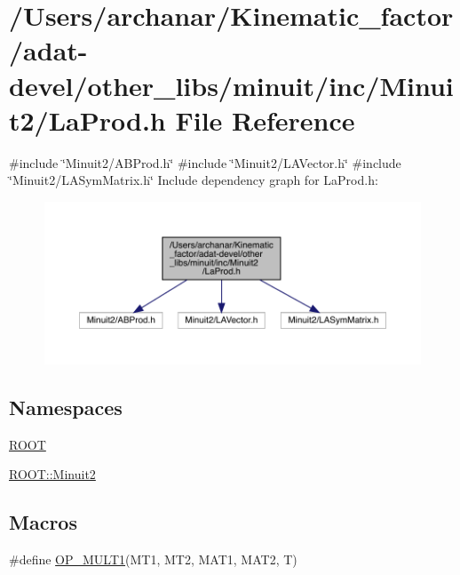 \hypertarget{adat-devel_2other__libs_2minuit_2inc_2Minuit2_2LaProd_8h}{}\section{/\+Users/archanar/\+Kinematic\+\_\+factor/adat-\/devel/other\+\_\+libs/minuit/inc/\+Minuit2/\+La\+Prod.h File Reference}
\label{adat-devel_2other__libs_2minuit_2inc_2Minuit2_2LaProd_8h}
{\ttfamily \#include \char`\"{}Minuit2/\+A\+B\+Prod.\+h\char`\"{}}\newline
{\ttfamily \#include \char`\"{}Minuit2/\+L\+A\+Vector.\+h\char`\"{}}\newline
{\ttfamily \#include \char`\"{}Minuit2/\+L\+A\+Sym\+Matrix.\+h\char`\"{}}\newline
Include dependency graph for La\+Prod.\+h\+:
\nopagebreak
\begin{figure}[H]
\begin{center}
\leavevmode
\includegraphics[width=350pt]{d5/d33/adat-devel_2other__libs_2minuit_2inc_2Minuit2_2LaProd_8h__incl}
\end{center}
\end{figure}
\subsection*{Namespaces}
\begin{DoxyCompactItemize}
\item 
 \mbox{\hyperlink{namespaceROOT}{R\+O\+OT}}
\item 
 \mbox{\hyperlink{namespaceROOT_1_1Minuit2}{R\+O\+O\+T\+::\+Minuit2}}
\end{DoxyCompactItemize}
\subsection*{Macros}
\begin{DoxyCompactItemize}
\item 
\#define \mbox{\hyperlink{adat-devel_2other__libs_2minuit_2inc_2Minuit2_2LaProd_8h_ac3dc7f6e38114355c8815fb08af8aa47}{O\+P\+\_\+\+M\+U\+L\+T1}}(M\+T1,  M\+T2,  M\+A\+T1,  M\+A\+T2,  T)
\end{DoxyCompactItemize}


